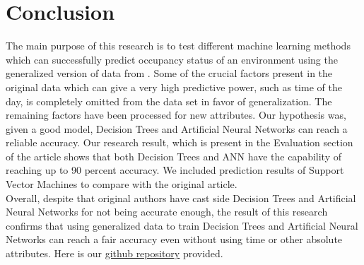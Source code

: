 \documentclass[conference]{IEEEtran}
\begin{document}
\section{Conclusion}
The main purpose of this research is to test different
machine learning methods which can successfully predict
occupancy status of an environment using the generalized
version of data from \cite{Candanedo}. Some of the crucial factors
present in the original data which can give a very high
predictive power, such as time of the day, is completely
omitted from the data set in favor of generalization. The
remaining factors have been processed for new attributes.
Our hypothesis was, given a good model, Decision Trees and Artificial
Neural Networks can reach a reliable accuracy. Our research result, which is present
in the Evaluation section of the article shows that both Decision Trees and ANN have the capability of reaching up to 90
percent accuracy. We included prediction results of
Support Vector Machines to compare with the original article.\\

Overall, despite that original authors have cast side Decision Trees and
Artificial Neural Networks for not being accurate enough, the result of this research confirms that using generalized data to train Decision Trees and Artificial
Neural Networks can reach a fair accuracy even without using time or other absolute
attributes. Here is our \href{https://github.com/robofoxy/Energy-Efficient-Smart-Buildings-by-Occupancy-Prediction/tree/master}{github repository} provided.
\end{document}
